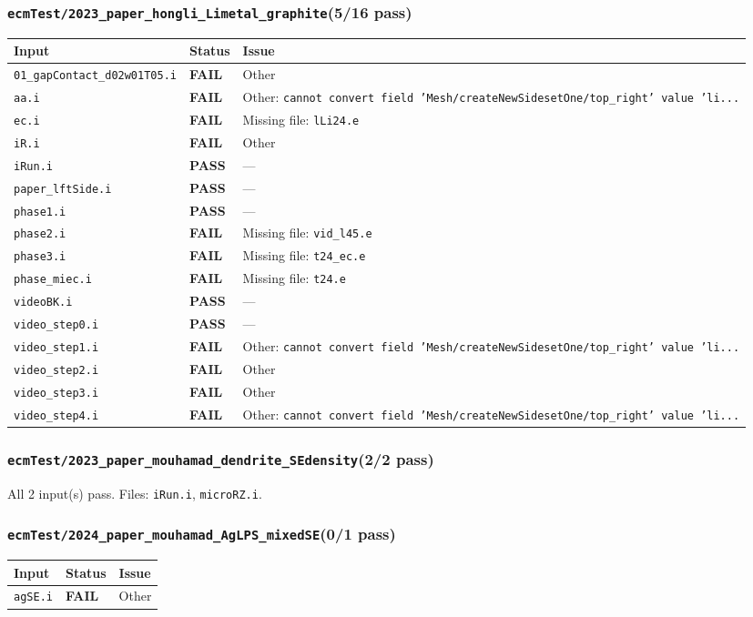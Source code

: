 \documentclass[10pt,letterpaper]{article}
\newcommand{\PASS}{\textcolor{passgreen}{\textbf{PASS}}}
\newcommand{\FAIL}{\textcolor{failred}{\textbf{FAIL}}}
\newcommand{\code}[1]{\texttt{\small #1}}
\begin{document}
\subsubsection{\code{ecmTest/2023\_paper\_hongli\_Limetal\_graphite}\hfill (5/16 pass)}
\begin{longtable}{p{} l p{}}
\toprule
Input & Status & Issue \\
\midrule
\endhead
\code{01\_gapContact\_d02w01T05.i} & \FAIL & Other \\
\code{aa.i} & \FAIL & Other: \code{cannot convert field 'Mesh/createNewSidesetOne/top\_right' value 'li...} \\
\code{ec.i} & \FAIL & Missing file: \code{lLi24.e} \\
\code{iR.i} & \FAIL & Other \\
\code{iRun.i} & \PASS & --- \\
\code{paper\_lftSide.i} & \PASS & --- \\
\code{phase1.i} & \PASS & --- \\
\code{phase2.i} & \FAIL & Missing file: \code{vid\_l45.e} \\
\code{phase3.i} & \FAIL & Missing file: \code{t24\_ec.e} \\
\code{phase\_miec.i} & \FAIL & Missing file: \code{t24.e} \\
\code{videoBK.i} & \PASS & --- \\
\code{video\_step0.i} & \PASS & --- \\
\code{video\_step1.i} & \FAIL & Other: \code{cannot convert field 'Mesh/createNewSidesetOne/top\_right' value 'li...} \\
\code{video\_step2.i} & \FAIL & Other \\
\code{video\_step3.i} & \FAIL & Other \\
\code{video\_step4.i} & \FAIL & Other: \code{cannot convert field 'Mesh/createNewSidesetOne/top\_right' value 'li...} \\
\bottomrule
\end{longtable}

\subsubsection{\code{ecmTest/2023\_paper\_mouhamad\_dendrite\_SEdensity}\hfill (2/2 pass)}
All 2 input(s) pass. Files: \code{iRun.i}, \code{microRZ.i}.

\subsubsection{\code{ecmTest/2024\_paper\_mouhamad\_AgLPS\_mixedSE}\hfill (0/1 pass)}
\begin{longtable}{p{} l p{}}
\toprule
Input & Status & Issue \\
\midrule
\endhead
\code{agSE.i} & \FAIL & Other \\
\bottomrule
\end{longtable}
\end{document}

